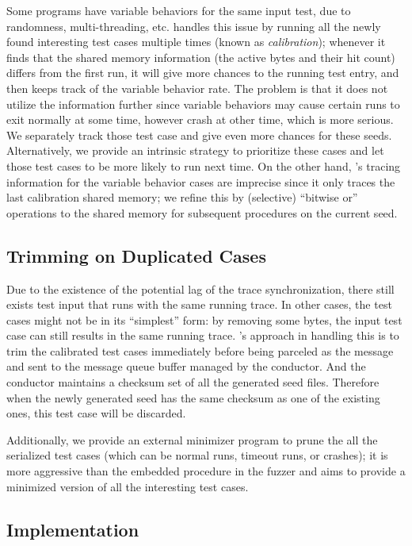 Some programs have variable behaviors for the same input test, due to randomness, multi-threading, etc. {\AFL} handles this issue by running all the newly found interesting test cases multiple times (known as \emph{calibration}); whenever it finds that the shared memory information (the active bytes and their hit count) differs from the first run, it will give more chances to the running test entry, and then keeps track of the variable behavior rate. The problem is that it does not utilize the information further since variable behaviors may cause certain runs to exit normally at some time, however crash at other time, which is more serious. We separately track those test case and give even more chances for these seeds. Alternatively, we provide an intrinsic strategy to prioritize these cases and let those test cases to be more likely to run next time. On the other hand, {\AFL}'s tracing information for the variable behavior cases are imprecise since it only traces the last calibration shared memory; we refine this by (selective) ``bitwise or'' operations to the shared memory for subsequent procedures on the current seed.


 \subsection{Trimming on Duplicated Cases}
Due to the existence of the potential lag of the trace synchronization, there still exists test input that runs with the same running trace. In other cases, the test cases might not be in its ``simplest'' form: by removing some bytes, the input test case can still results in the same running trace. {\FOT}'s approach in handling this is to trim the calibrated test cases immediately before being parceled as the message and sent to the message queue buffer managed by the conductor. And the conductor maintains a checksum set of all the generated seed files. Therefore when the newly generated seed has the same checksum as one of the existing ones, this test case will be discarded.

Additionally, we provide an external minimizer program to prune the all the serialized test cases (which can be normal runs, timeout runs, or crashes); it is more aggressive than the embedded procedure in the fuzzer and aims to provide a minimized version of all the interesting test cases.
 

\subsection{Implementation}\label{sec:fot-impl}

